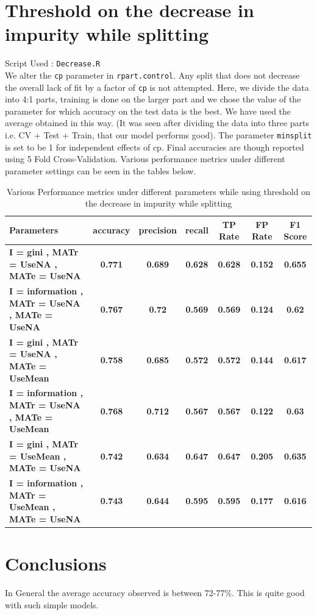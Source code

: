 \documentclass[12pt]{article}%
\begin{document}
\section{Threshold on the decrease in impurity while splitting}
Script Used : {\tt Decrease.R} \\ 
We alter the {\tt cp} parameter in {\tt rpart.control}. Any split that does not decrease the overall lack of fit by a factor of {\tt cp} is not attempted. 
Here, we divide the data into 4:1 parts, training is done on the larger part and we chose the value of the parameter for which accuracy on the test data is the best. We have used the average obtained in this way. (It was seen after dividing the data into three parts i.e. CV +  Test +  Train, that our model performs good). The parameter {\tt minsplit} is set to be 1 for independent effects of cp. Final accuracies are though reported using 5 Fold Cross-Validation. Various performance metrics under different parameter settings can be seen in the tables below. 
\begin{center}
\begin{table}
\centering
\label{table:prune}
\caption{Various Performance metrics under different parameters while using threshold on the decrease in impurity while splitting}
\begin{tabular}{|p{2in}|c|c|c|c|c|c|}
 \hline
 {\bf Parameters } & {\bf accuracy } & {\bf precision } & {\bf recall } & {\bf TP Rate } & {\bf FP Rate } & {\bf F1 Score } \\ \hline
 {\bf I = gini , MATr = UseNA , MATe = UseNA  } & {\bf 0.771 } & {\bf 0.689 } & {\bf 0.628 } & {\bf 0.628 } & {\bf 0.152 } & {\bf 0.655 } \\ \hline
 {\bf I = information , MATr = UseNA , MATe = UseNA  } & {\bf 0.767 } & {\bf 0.72 } & {\bf 0.569 } & {\bf 0.569 } & {\bf 0.124 } & {\bf 0.62 } \\ \hline
  {\bf I = gini , MATr = UseNA , MATe = UseMean  } & {\bf 0.758 } & {\bf 0.685 } & {\bf 0.572 } & {\bf 0.572 } & {\bf 0.144 } & {\bf 0.617 } \\ \hline
  {\bf I = information , MATr = UseNA , MATe = UseMean  } & {\bf 0.768 } & {\bf 0.712 } & {\bf 0.567 } & {\bf 0.567 } & {\bf 0.122 } & {\bf 0.63 } \\ \hline
  {\bf I = gini , MATr = UseMean , MATe = UseNA  } & {\bf 0.742 } & {\bf 0.634 } & {\bf 0.647 } & {\bf 0.647 } & {\bf 0.205 } & {\bf 0.635 } \\ \hline
  {\bf I = information , MATr = UseMean , MATe = UseNA  } & {\bf 0.743 } & {\bf 0.644 } & {\bf 0.595 } & {\bf 0.595 } & {\bf 0.177 } & {\bf 0.616 } \\ \hline
    
\end{tabular}
\end{table}
\end{center}

\section{Conclusions}
In General the average accuracy observed is between 72-77\%. This is quite good with such simple models.
\end{document}
